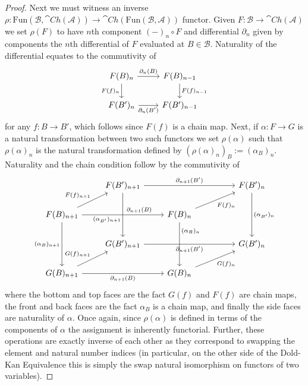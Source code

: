 \begin{proof}
    Next we must witness an inverse $\rho:\text{Fun}(\mathcal{B},\cat{Ch}(\mathcal{A}))\rightarrow \cat{Ch}(\text{Fun}(\mathcal{B},\mathcal{A}))$ functor. Given $F:\mathcal{B}\rightarrow \cat{Ch}(\mathcal{A})$ we set $\rho(F)$ to have $n$th component $(-)_n\circ F$ and differential $\partial_n$ given by components the $n$th differential of $F$ evaluated at $B  \in \mathcal{B}$. Naturality of the differential equates to the commutivity of 
    \[\begin{tikzcd}
    	{F(B)_n} & {F(B)_{n-1}} \\
    	{F(B')_n} & {F(B')_{n-1}}
    	\arrow["{F(f)_n}"', from=1-1, to=2-1]
    	\arrow["{\partial_n(B)}", from=1-1, to=1-2]
    	\arrow["{\partial_n(B')}"', from=2-1, to=2-2]
    	\arrow["{F(f)_{n-1}}", from=1-2, to=2-2]
    \end{tikzcd}\]
    for any $f:B\rightarrow B'$, which follows since $F(f)$ is a chain map. Next, if $\alpha:F\rightarrow G$ is a natural transformation between two such functors we set $\rho(\alpha)$ such that $\rho(\alpha)_n$ is the natural transformation defined by $(\rho(\alpha)_n)_B := (\alpha_B)_n$. Naturality and the chain condition follow by the commutivity of 
    \[\begin{tikzcd}
    	& {F(B')_{n+1}} &&& {F(B')_n} \\
    	{F(B)_{n+1}} && {F(B)_n} \\
    	& {G(B')_{n+1}} &&& {G(B')_n} \\
    	{G(B)_{n+1}} && {G(B)_n}
    	\arrow["{\partial_{n+1}(B)}"{pos=0.7}, from=2-1, to=2-3]
    	\arrow["{(\alpha_B)_{n+1}}"', from=2-1, to=4-1]
    	\arrow["{\partial_{n+1}(B)}"', from=4-1, to=4-3]
    	\arrow["{(\alpha_B)_n}"{pos=0.2}, from=2-3, to=4-3]
    	\arrow["{F(f)_{n+1}}", from=2-1, to=1-2]
    	\arrow["{F(f)_n}"', from=2-3, to=1-5]
    	\arrow["{\partial_{n+1}(B')}", from=1-2, to=1-5]
    	\arrow["{(\alpha_{B'})_n}", from=1-5, to=3-5]
    	\arrow["{G(f)_n}"', from=4-3, to=3-5]
    	\arrow["{G(f)_{n+1}}", from=4-1, to=3-2]
    	\arrow["{(\alpha_{B'})_{n+1}}"'{pos=0.6}, from=1-2, to=3-2]
    	\arrow["{\partial_{n+1}(B')}"', from=3-2, to=3-5]
    \end{tikzcd}\]
    where the bottom and top faces are the fact $G(f)$ and $F(f)$ are chain maps, the front and back faces are the fact $\alpha_B$ is a chain map, and finally the side faces are naturality of $\alpha$. Once again, since $\rho(\alpha)$ is defined in terms of the components of $\alpha$ the assignment is inherently functorial. Further, these operations are exactly inverse of each other as they correspond to swapping the element and natural number indices (in particular, on the other side of the Dold-Kan Equivalence this is simply the swap natural isomorphism on functors of two variables).
\end{proof}


